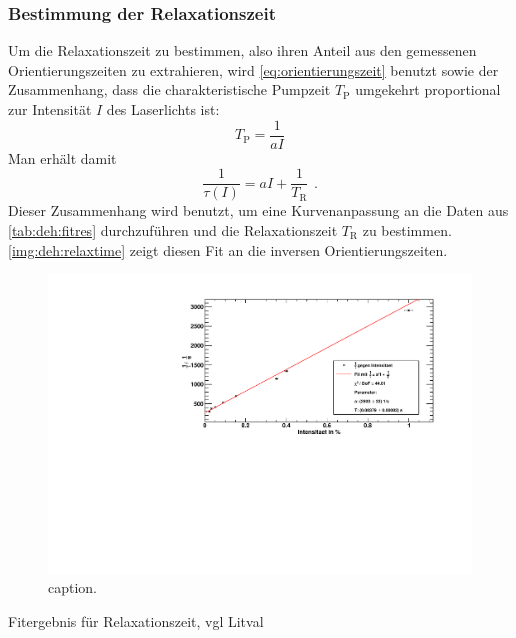 \subsubsection*{Bestimmung der Relaxationszeit}
Um die Relaxationszeit zu bestimmen, also ihren Anteil aus den gemessenen Orientierungszeiten zu extrahieren,
wird \autoref{eq:orientierungszeit} benutzt sowie der Zusammenhang,
dass die charakteristische Pumpzeit $T_\text{P}$ umgekehrt proportional zur Intensität $I$ des Laserlichts ist:
\begin{equation}
  T_\text{P} = \frac{1}{aI} 
\end{equation}
Man erhält damit
\begin{equation}
  \frac{1}{\tau(I)}=aI + \frac{1}{T_\text{R}} \ \,.
\end{equation}
Dieser Zusammenhang wird benutzt, um eine Kurvenanpassung an die Daten aus \autoref{tab:deh:fitres}
durchzuführen und die Relaxationszeit $T_\text{R}$ zu bestimmen.
\autoref{img:deh:relaxtime} zeigt diesen Fit an die inversen Orientierungszeiten.

\begin{figure}[H]
\begin{center}
  \includegraphics[width=\textwidth]{../img/part5/taufit.pdf}
  \caption{caption.}
  \label{img:deh:relaxtime}
\end{center}
\end{figure}




Fitergebnis für Relaxationszeit, vgl Litval

